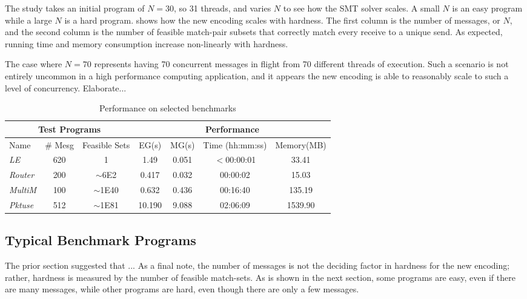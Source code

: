 The study takes an initial program of $N = 30$, so 31 threads, and varies $N$ to see how the SMT solver scales. A small $N$ is an easy program while a large $N$ is a hard program.  shows how the new encoding scales with hardness. The first column is the number of messages, or $N$, and the second column is the number of feasible match-pair subsets that correctly match every receive to a unique send. As expected, running time and memory consumption increase non-linearly with hardness. 

The case where $N=70$ represents having 70 concurrent messages in flight from 70 different threads of execution. Such a scenario is not entirely uncommon in a high performance computing application, and it appears the new encoding is able to reasonably scale to such a level of concurrency. Elaborate...

\begin{table}
\begin{center}
\setlength{\tabcolsep}{2pt}
\scriptsize
\caption{Performance on selected benchmarks \label{table:second}}
\begin{tabular}{|l|c|c|c|c|c|c|}
		\hline
         \multicolumn{3}{|c|}{Test Programs} & \multicolumn{4}{|c|}{Performance} \\ \hline
         Name & \# Mesg & Feasible Sets & EG(s) & MG(s) & Time (hh:mm:ss) & Memory(MB) \\ \hline
         \textit{LE} & 620 & 1 & 1.49 & 0.051 & $<$00:00:01 & 33.41  \\ %
         \textit{Router} & 200 & $\sim$6E2 & 0.417 & 0.032 & 00:00:02 & 15.03  \\ %
         \textit{MultiM} & 100 & $\sim$1E40 & 0.632 & 0.436 &  00:16:40 & 135.19  \\ %
         \textit{Pktuse} & 512 & $\sim$1E81 & 10.190 & 9.088 & 02:06:09 & 1539.90 \\ %
         \hline
		\end{tabular}
\end{center}
\end{table}

\subsection{Typical Benchmark Programs}
The prior section suggested that ... As a final note, the number of messages is not the deciding factor in hardness for the new encoding; rather, hardness is measured by the number of feasible match-sets. As is shown in the next section, some programs are easy, even if there are many messages, while other programs are hard, even though there are only a few messages.

